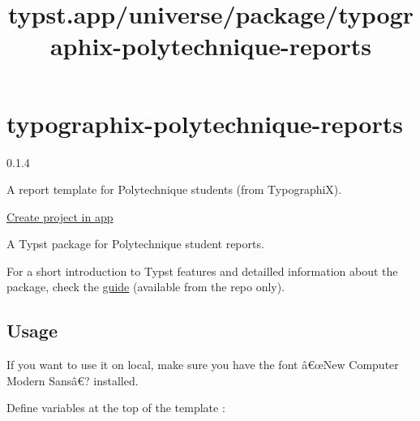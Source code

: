 \title{typst.app/universe/package/typographix-polytechnique-reports}

\label{banner}
\label{template-thumbnail}

\section{typographix-polytechnique-reports}\label{typographix-polytechnique-reports}

{ 0.1.4 }

A report template for Polytechnique students (from TypographiX).

\href{/app?template=typographix-polytechnique-reports&version=0.1.4}{Create
project in app}

\label{readme}
A Typst package for Polytechnique student reports.

For a short introduction to Typst features and detailled information
about the package, check the
\href{https://github.com/remigerme/typst-polytechnique/blob/main/guide.pdf}{guide}
(available from the repo only).

\subsection{Usage}\label{usage}

If you want to use it on local, make sure you have the font â€œNew
Computer Modern Sansâ€? installed.

Define variables at the top of the template :

\begin{Shaded}
\begin{Highlighting}[]

\end{Highlighting}
\end{Shaded}

